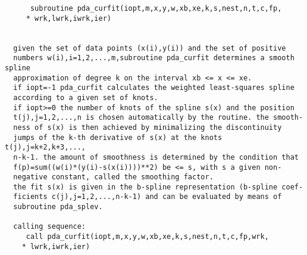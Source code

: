 \begin{verbatim}
      subroutine pda_curfit(iopt,m,x,y,w,xb,xe,k,s,nest,n,t,c,fp,
     * wrk,lwrk,iwrk,ier)


  given the set of data points (x(i),y(i)) and the set of positive
  numbers w(i),i=1,2,...,m,subroutine pda_curfit determines a smooth spline
  approximation of degree k on the interval xb <= x <= xe.
  if iopt=-1 pda_curfit calculates the weighted least-squares spline
  according to a given set of knots.
  if iopt>=0 the number of knots of the spline s(x) and the position
  t(j),j=1,2,...,n is chosen automatically by the routine. the smooth-
  ness of s(x) is then achieved by minimalizing the discontinuity
  jumps of the k-th derivative of s(x) at the knots t(j),j=k+2,k+3,...,
  n-k-1. the amount of smoothness is determined by the condition that
  f(p)=sum((w(i)*(y(i)-s(x(i))))**2) be <= s, with s a given non-
  negative constant, called the smoothing factor.
  the fit s(x) is given in the b-spline representation (b-spline coef-
  ficients c(j),j=1,2,...,n-k-1) and can be evaluated by means of
  subroutine pda_splev.

  calling sequence:
     call pda_curfit(iopt,m,x,y,w,xb,xe,k,s,nest,n,t,c,fp,wrk,
    * lwrk,iwrk,ier)


\end{verbatim}
